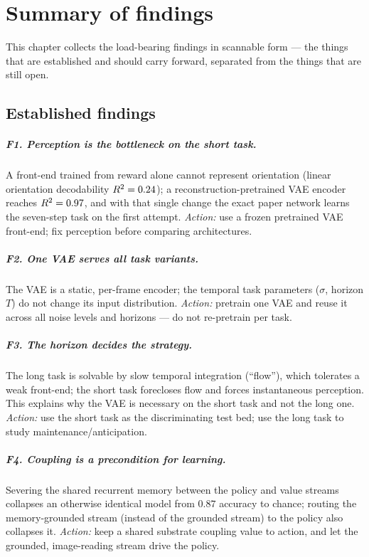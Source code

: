 \chapter{Summary of findings}
\label{ch:findings}

This chapter collects the load-bearing findings in scannable form --- the things that are
established and should carry forward, separated from the things that are still open.

\section{Established findings}

\paragraph{F1. Perception is the bottleneck on the short task.} A front-end trained from
reward alone cannot represent orientation (linear orientation decodability $R^{2}=0.24$);
a reconstruction-pretrained VAE encoder reaches $R^{2}=0.97$, and with that single change the
exact paper network learns the seven-step task on the first attempt. \emph{Action:} use a
frozen pretrained VAE front-end; fix perception before comparing architectures.

\paragraph{F2. One VAE serves all task variants.} The VAE is a static, per-frame encoder;
the temporal task parameters ($\sigma$, horizon $T$) do not change its input distribution.
\emph{Action:} pretrain one VAE and reuse it across all noise levels and horizons --- do not
re-pretrain per task.

\paragraph{F3. The horizon decides the strategy.} The long task is solvable by slow temporal
integration (``flow''), which tolerates a weak front-end; the short task forecloses flow and
forces instantaneous perception. This explains why the VAE is necessary on the short task
and not the long one. \emph{Action:} use the short task as the discriminating test bed; use
the long task to study maintenance/anticipation.

\paragraph{F4. Coupling is a precondition for learning.} Severing the shared recurrent
memory between the policy and value streams collapses an otherwise identical model from
$0.87$ accuracy to chance; routing the memory-grounded stream (instead of the grounded
stream) to the policy also collapses it. \emph{Action:} keep a shared substrate coupling
value to action, and let the grounded, image-reading stream drive the policy.

